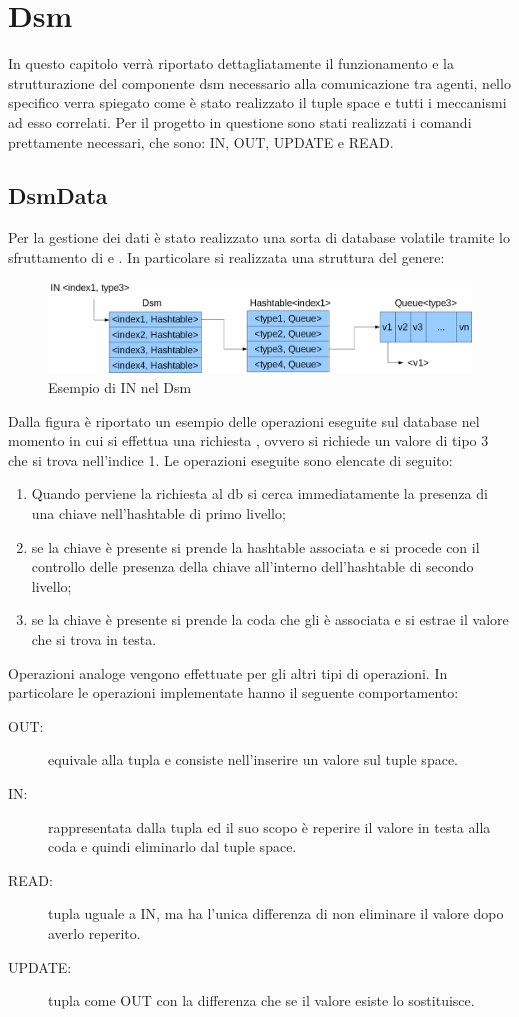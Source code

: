 \chapter{Dsm}
In questo capitolo verrà riportato dettagliatamente il funzionamento e la strutturazione del componente dsm necessario alla comunicazione tra agenti, nello specifico verra spiegato come è stato realizzato il tuple space e tutti i meccanismi ad esso correlati.
Per il progetto in questione sono stati realizzati i comandi prettamente necessari, che sono: IN, OUT, UPDATE e READ. 
\section{DsmData}
Per la gestione dei dati è stato realizzato una sorta di database volatile tramite lo sfruttamento di  e . In particolare si realizzata una struttura del genere:
\begin{figure}[H]
\begin{center}
\includegraphics[scale=0.3]{etc/dsm.png}
\caption{Esempio di IN nel Dsm}
\label{dsm}
\end{center}
\end{figure}
Dalla figura è riportato un esempio delle operazioni eseguite sul database nel momento in cui si effettua una richiesta , ovvero si richiede un valore di tipo 3 che si trova nell'indice 1. Le operazioni eseguite sono elencate di seguito:
\begin{enumerate}
	\item Quando perviene la richiesta al db si cerca immediatamente la presenza di una chiave  nell'hashtable di primo livello;
	\item se la chiave è presente si prende la hashtable associata e si procede con il controllo delle presenza della chiave  all'interno dell'hashtable di secondo livello;
	\item se la chiave è presente si prende la coda che gli è associata e si estrae il valore che si trova in testa.
\end{enumerate}
Operazioni analoge vengono effettuate per gli altri tipi di operazioni. In particolare le operazioni implementate hanno il seguente comportamento:
\begin{description}
	\item[OUT:] equivale alla tupla  e consiste nell'inserire un valore sul tuple space.
	\item[IN:] rappresentata dalla tupla  ed il suo scopo è reperire il valore in testa alla coda e quindi eliminarlo dal tuple space.
	\item[READ:] tupla uguale a IN, ma ha l'unica differenza di non eliminare il valore dopo averlo reperito.
	\item[UPDATE:] tupla come OUT con la differenza che se il valore esiste lo sostituisce.
\end{description}
